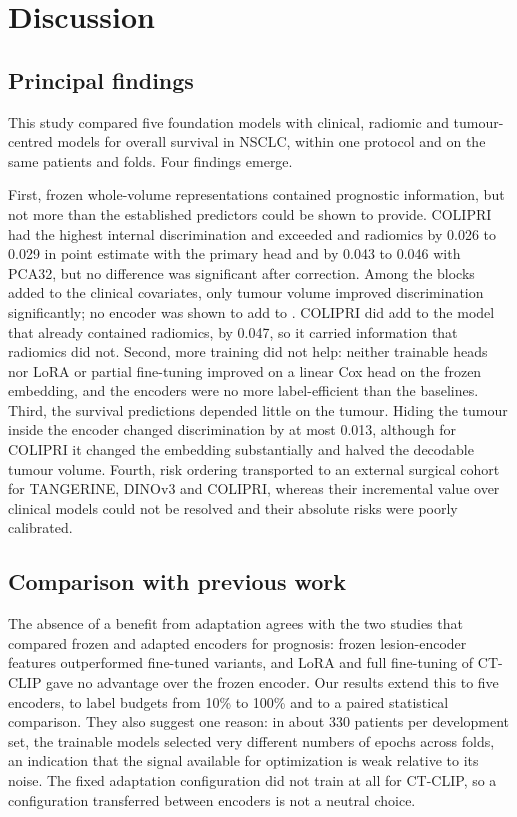 \section{Discussion}\label{sec:discussion}

\subsection{Principal findings}
This study compared five foundation models with clinical, radiomic and tumour-centred models for overall survival in NSCLC, within one protocol and on the same patients and folds. Four findings emerge.

First, frozen whole-volume representations contained prognostic information, but not more than the established predictors could be shown to provide. COLIPRI had the highest internal discrimination and exceeded  and radiomics by 0.026 to 0.029 in point estimate with the primary head and by 0.043 to 0.046 with PCA32, but no difference was significant after correction. Among the blocks added to the clinical covariates, only tumour volume improved discrimination significantly; no encoder was shown to add to . COLIPRI did add to the model that already contained radiomics, by 0.047, so it carried information that radiomics did not. Second, more training did not help: neither trainable heads nor LoRA or partial fine-tuning improved on a linear Cox head on the frozen embedding, and the encoders were no more label-efficient than the baselines. Third, the survival predictions depended little on the tumour. Hiding the tumour inside the encoder changed discrimination by at most 0.013, although for COLIPRI it changed the embedding substantially and halved the decodable tumour volume. Fourth, risk ordering transported to an external surgical cohort for TANGERINE, DINOv3 and COLIPRI, whereas their incremental value over clinical models could not be resolved and their absolute risks were poorly calibrated.

\subsection{Comparison with previous work}
The absence of a benefit from adaptation agrees with the two studies that compared frozen and adapted encoders for prognosis: frozen lesion-encoder features outperformed fine-tuned variants,\cite{pai2024} and LoRA and full fine-tuning of CT-CLIP gave no advantage over the frozen encoder.\cite{allgower2026} Our results extend this to five encoders, to label budgets from 10\% to 100\% and to a paired statistical comparison. They also suggest one reason: in about 330 patients per development set, the trainable models selected very different numbers of epochs across folds, an indication that the signal available for optimization is weak relative to its noise. The fixed adaptation configuration did not train at all for CT-CLIP, so a configuration transferred between encoders is not a neutral choice.

